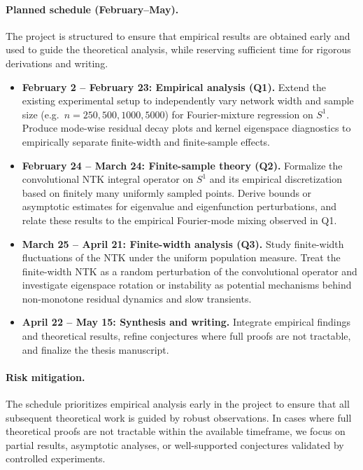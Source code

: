 \paragraph{Planned schedule (February--May).}
The project is structured to ensure that empirical results are obtained early
and used to guide the theoretical analysis, while reserving sufficient time for
rigorous derivations and writing.

\begin{itemize}
	\item \textbf{February 2 -- February 23: Empirical analysis (Q1).}
	      Extend the existing experimental setup to independently vary network width and
	      sample size (e.g.\ $n = 250, 500, 1000, 5000$) for Fourier-mixture regression on
	      $S^1$. Produce mode-wise residual decay plots and kernel eigenspace diagnostics
	      to empirically separate finite-width and finite-sample effects.

	\item \textbf{February 24 -- March 24: Finite-sample theory (Q2).}
	      Formalize the convolutional NTK integral operator on $S^1$ and its empirical
	      discretization based on finitely many uniformly sampled points. Derive bounds
	      or asymptotic estimates for eigenvalue and eigenfunction perturbations, and
	      relate these results to the empirical Fourier-mode mixing observed in Q1.

	\item \textbf{March 25 -- April 21: Finite-width analysis (Q3).}
	      Study finite-width fluctuations of the NTK under the uniform population measure.
	      Treat the finite-width NTK as a random perturbation of the convolutional
	      operator and investigate eigenspace rotation or instability as potential
	      mechanisms behind non-monotone residual dynamics and slow transients.

	\item \textbf{April 22 -- May 15: Synthesis and writing.}
	      Integrate empirical findings and theoretical results, refine conjectures where
	      full proofs are not tractable, and finalize the thesis manuscript.
\end{itemize}

\paragraph{Risk mitigation.}
The schedule prioritizes empirical analysis early in the project to ensure that
all subsequent theoretical work is guided by robust observations. In cases
where full theoretical proofs are not tractable within the available timeframe,
we focus on partial results, asymptotic analyses, or well-supported conjectures
validated by controlled experiments.
